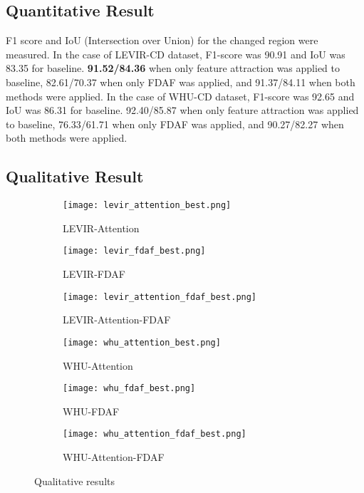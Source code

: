 \documentclass[../main.tex]{subfiles}
\begin{document}
\subsection{Quantitative Result}
F1 score and IoU (Intersection over Union) for the changed region were measured. In the case of LEVIR-CD dataset, F1-score was 90.91 and IoU was 83.35 for baseline. \textbf{91.52/84.36} when only feature attraction was applied to baseline, 82.61/70.37 when only FDAF was applied, and 91.37/84.11 when both methods were applied. In the case of WHU-CD dataset, F1-score was 92.65 and IoU was 86.31 for baseline.  92.40/85.87 when only feature attraction was applied to baseline, 76.33/61.71 when only FDAF was applied, and 90.27/82.27 when both methods were applied.



\subsection{Qualitative Result}
\begin{figure}[h]
    \centering
    \begin{subfigure}[b]{0.3\linewidth}
        \texttt{[image: levir\_attention\_best.png]}
        \caption{LEVIR-Attention}
    \end{subfigure}
    \begin{subfigure}[b]{0.3\linewidth}
        \texttt{[image: levir\_fdaf\_best.png]}
        \caption{LEVIR-FDAF}
    \end{subfigure}
    \begin{subfigure}[b]{0.3\linewidth}
        \texttt{[image: levir\_attention\_fdaf\_best.png]}
        \caption{LEVIR-Attention-FDAF}
    \end{subfigure}
    \begin{subfigure}[b]{0.3\linewidth}
        \texttt{[image: whu\_attention\_best.png]}
        \caption{WHU-Attention}
    \end{subfigure}
    \begin{subfigure}[b]{0.3\linewidth}
        \texttt{[image: whu\_fdaf\_best.png]}
        \caption{WHU-FDAF}
    \end{subfigure}
    \begin{subfigure}[b]{0.3\linewidth}
        \texttt{[image: whu\_attention\_fdaf\_best.png]}
        \caption{WHU-Attention-FDAF}
    \end{subfigure}
    \caption{Qualitative results}
    \label{fig:qualitative_results}
\end{figure}
\end{document}

